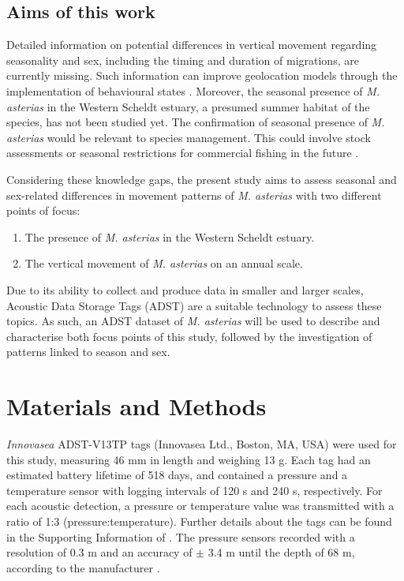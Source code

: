 \documentclass[
  authoryear,
  review,
  3p]{elsarticle}
\providecommand{\tightlist}{%
  \setlength{\itemsep}{0pt}\setlength{\parskip}{0pt}}\usepackage{longtable,booktabs,array}
\begin{document}
\hypertarget{sec-intro-aims}{%
\subsection{Aims of this work}\label{sec-intro-aims}}

Detailed information on potential differences in vertical movement
regarding seasonality and sex, including the timing and duration of
migrations, are currently missing. Such information can improve
geolocation models through the implementation of behavioural states
\citep{pedersen_2008}. Moreover, the seasonal presence of \emph{M.
asterias} in the Western Scheldt estuary, a presumed summer habitat of
the species, has not been studied yet. The confirmation of seasonal
presence of \emph{M. asterias} would be relevant to species management.
This could involve stock assessments or seasonal restrictions for
commercial fishing in the future \citep{benot_2003}.

Considering these knowledge gaps, the present study aims to assess
seasonal and sex-related differences in movement patterns of \emph{M.
asterias} with two different points of focus:

\begin{enumerate}
\def\labelenumi{\arabic{enumi}.}
\tightlist
\item
  The presence of \emph{M. asterias} in the Western Scheldt estuary.
\item
  The vertical movement of \emph{M. asterias} on an annual scale.
\end{enumerate}

Due to its ability to collect and produce data in smaller and larger
scales, Acoustic Data Storage Tags (ADST) are a suitable technology to
assess these topics. As such, an ADST dataset of \emph{M. asterias} will
be used to describe and characterise both focus points of this study,
followed by the investigation of patterns linked to season and sex.

\hypertarget{sec-mm}{%
\section{Materials and Methods}\label{sec-mm}}

\emph{Innovasea} ADST-V13TP tags (Innovasea Ltd., Boston, MA, USA) were
used for this study, measuring 46 mm in length and weighing 13 g. Each
tag had an estimated battery lifetime of 518 days, and contained a
pressure and a temperature sensor with logging intervals of 120 s and
240 s, respectively. For each acoustic detection, a pressure or
temperature value was transmitted with a ratio of 1:3
(pressure:temperature). Further details about the tags can be found in
the Supporting Information of \citet{goossens_2023}. The pressure
sensors recorded with a resolution of 0.3 m and an accuracy of \(\pm\)
3.4 m until the depth of 68 m, according to the manufacturer
\citep{Innovasea_ADST}.
\end{document}
